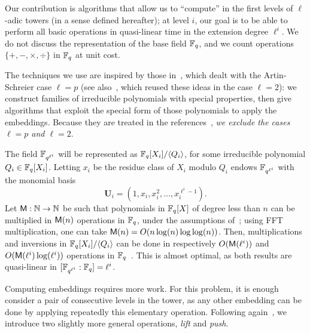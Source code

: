 \documentclass{sig-alternate}
\newcommand{\uu}{\mathbf{U}}  %
\begin{document}
Our contribution is algorithms that allow us to ``compute'' in the
first levels of $\ell$-adic towers (in a sense defined hereafter); at
level $i$, our goal is to be able to perform all basic operations in
quasi-linear time in the extension degree $\ell^i$.  We do not discuss
the representation of the base field $\mathbb{F}_q$, and we count 
operations $\{+,-,\times,\div\}$ in $\mathbb{F}_q$ at unit cost.


The techniques we use are inspired by those in~\cite{df+schost12},
which dealt with the Artin-Schreier case $\ell=p$ (see
also~\cite{DoSc12}, which reused these ideas in the case $\ell=2$): we
construct families of irreducible polynomials with special properties,
then give algorithms that exploit the special form of those
polynomials to apply the embeddings. Because they are treated in the
references~\cite{df+schost12,DoSc12}, {\em we exclude the cases $\ell=p$
and $\ell=2$}.

The field $\mathbb{F}_{q^{\ell^i}}$ will be represented as $\mathbb{F}_q[X_i]/\langle
Q_i\rangle$, for some irreducible polynomial $Q_i \in
\mathbb{F}_q[X_i]$. Letting $x_i$ be the residue class of $X_i$ modulo $Q_i$
endows $\mathbb{F}_{q^{\ell^i}}$ with the monomial basis
\begin{equation}
  \label{eq:uni-basis1}
  \uu_i = (1,x_{i},x_{i}^2,\ldots,x_{i}^{\ell^{i}-1}).
\end{equation}
Let $\mathsf{M} : \mathbb{N} \rightarrow
\mathbb{N}$ be such that polynomials in $\mathbb{F}_q[X]$ of degree less than $n$ can
be multiplied in $\mathsf{M}(n)$ operations in $\mathbb{F}_q$, under the
assumptions of~\cite[Ch.~8.3]{vzGG}; using FFT multiplication, one can
take $\mathsf{M}(n)=O(n\log (n) \log\log (n))$. Then, multiplications and
inversions in $\mathbb{F}_q[X_i]/\langle Q_i \rangle$ can be done in
respectively $O(\mathsf{M}(\ell^i))$ and $O(\mathsf{M}(\ell^i)\log(\ell^i))$
operations in $\mathbb{F}_q$~\cite[Ch.~9-11]{vzGG}. This is almost optimal, as
both results are quasi-linear in $[\mathbb{F}_{q^{\ell^i}}:\mathbb{F}_q]=\ell^i$.

Computing embeddings requires more work. For this problem, it is
enough consider a pair of consecutive levels in the tower, as any
other embedding can be done by applying repeatedly this elementary
operation. Following again~\cite{df+schost12}, we introduce two
slightly more general operations, {\em lift} and {\em push}.
\end{document}
